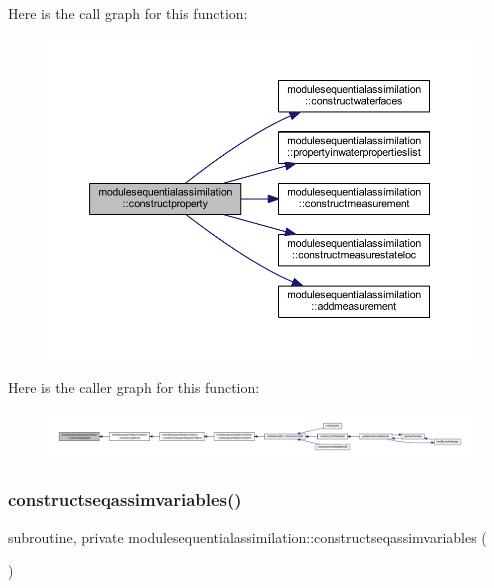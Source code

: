 Here is the call graph for this function\+:\nopagebreak
\begin{figure}[H]
\begin{center}
\leavevmode
\includegraphics[width=350pt]{namespacemodulesequentialassimilation_a37aa5f00e0026d3fb403e9d6fd041de3_cgraph}
\end{center}
\end{figure}
Here is the caller graph for this function\+:\nopagebreak
\begin{figure}[H]
\begin{center}
\leavevmode
\includegraphics[width=350pt]{namespacemodulesequentialassimilation_a37aa5f00e0026d3fb403e9d6fd041de3_icgraph}
\end{center}
\end{figure}
\mbox{\label{namespacemodulesequentialassimilation_adb290ebd31525621b87da4ea0f2c443c}} 
\subsubsection{\texorpdfstring{constructseqassimvariables()}{constructseqassimvariables()}}
{\footnotesize\ttfamily subroutine, private modulesequentialassimilation\+::constructseqassimvariables (\begin{DoxyParamCaption}{ }\end{DoxyParamCaption})\hspace{0.3cm}{\ttfamily [private]}}

